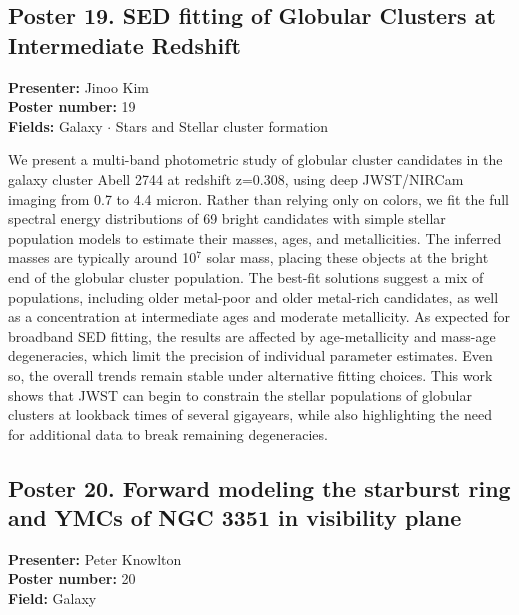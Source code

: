 \hypertarget{poster-abstract-talk-130}{}\label{poster-abstract-page-talk-130}
\subsection*{Poster 19. SED fitting of Globular Clusters at Intermediate Redshift}
\textbf{Presenter:} Jinoo Kim\\
\textbf{Poster number:} 19\\
\textbf{Fields:} Galaxy $\cdot$ Stars and Stellar cluster formation

We present a multi-band photometric study of globular cluster candidates in the galaxy cluster Abell 2744 at redshift z=0.308, using deep JWST/NIRCam imaging from 0.7 to 4.4 micron. Rather than relying only on colors, we fit the full spectral energy distributions of 69 bright candidates with simple stellar population models to estimate their masses, ages, and metallicities. The inferred masses are typically around 10$^7$ solar mass, placing these objects at the bright end of the globular cluster population. The best-fit solutions suggest a mix of populations, including older metal-poor and older metal-rich candidates, as well as a concentration at intermediate ages and moderate metallicity. As expected for broadband SED fitting, the results are affected by age-metallicity and mass-age degeneracies, which limit the precision of individual parameter estimates. Even so, the overall trends remain stable under alternative fitting choices. This work shows that JWST can begin to constrain the stellar populations of globular clusters at lookback times of several gigayears, while also highlighting the need for additional data to break remaining degeneracies.

\hypertarget{poster-abstract-talk-271}{}\label{poster-abstract-page-talk-271}
\subsection*{Poster 20. Forward modeling the starburst ring and YMCs of NGC 3351 in visibility plane}
\textbf{Presenter:} Peter Knowlton\\
\textbf{Poster number:} 20\\
\textbf{Field:} Galaxy

